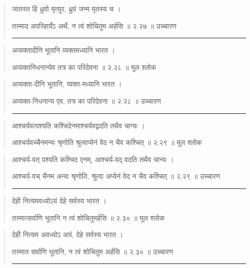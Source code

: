 \begin{quotation}

जातस्त हि ध्रुवो मृत्युर, ध्रुवं जन्म मृतस्य च  ।  

तस्माद अपरिहार्येऽ अर्थे, न त्वं शोचितुम अर्हसि  ॥ २.२७ ॥  उच्चारण

\noindent\rule{16cm}{0.4pt} 
\end{quotation}


\begin{quotation}

अव्यक्तादीनि भूतानि व्यक्तमध्यानि भारत  ।  

अव्यक्तनिधनान्येव तत्र का परिदेवना  ॥ २.२८ ॥  मूल श्लोक
\end{quotation}

\begin{quotation}

अव्यक्ता-दीनि भूतानि, व्यक्त-मध्यानि भारत  ।  

अव्यक्त-निधनान्य एव, तत्र का परिदेवना  ॥ २.२८ ॥  उच्चारण

\noindent\rule{16cm}{0.4pt} 
\end{quotation}


\begin{quotation}

आश्चर्यवत्पश्यति कश्चिदेनमाश्चर्यवद्वदति तथैव चान्यः  ।  

आश्चर्यवच्चैनमन्यः श्रृणोति श्रुत्वाप्येनं वेद न चैव कश्चित्‌  ॥ २.२९ ॥  मूल श्लोक
\end{quotation}

\begin{quotation}
आश्चर्य-वत् पश्यति कश्चिद एनम्, 
आश्चर्य-वद् वदति तथैव चान्यः  ।  

आश्चर्य-वच् चैनम अन्यः श्रृणोति, 
श्रुत्वा अप्येनं वेद न चैव कश्चित्‌  ॥ २.२९ ॥  उच्चारण

\noindent\rule{16cm}{0.4pt} 
\end{quotation}


\begin{quotation}

देही नित्यमवध्योऽयं देहे सर्वस्य भारत  ।  

तस्मात्सर्वाणि भूतानि न त्वं शोचितुमर्हसि  ॥ २.३० ॥  मूल श्लोक
\end{quotation}

\begin{quotation}

देही नित्यम अवध्योऽ अयं, देहे सर्वस्य भारत  ।  

तस्मात सर्वाणि भूतानि, न त्वं शोचितुम अर्हसि  ॥ २.३० ॥  उच्चारण

\noindent\rule{16cm}{0.4pt} 
\end{quotation}



